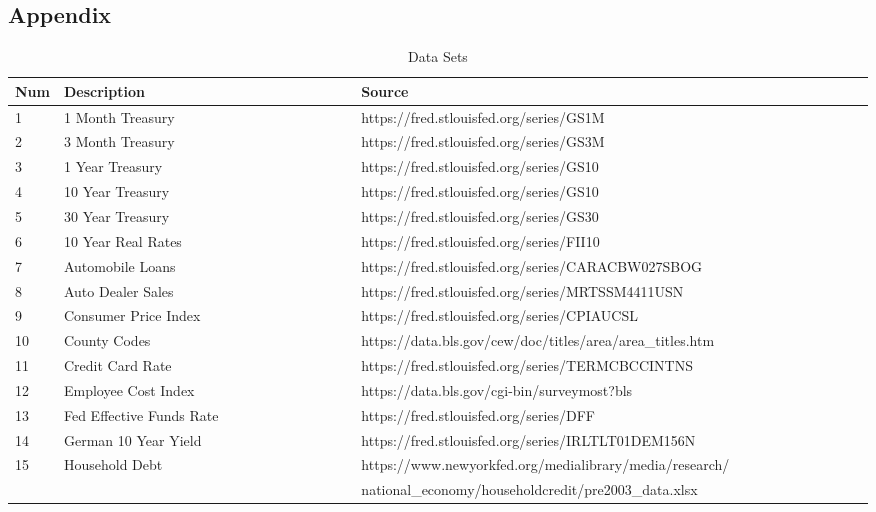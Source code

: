 \documentclass[sigconf,nonacm,11pt]{acmart}
\begin{document}



\appendix
\begin{appendix}

\section{Appendix}
\label{appendix:datasets}




\begin{table}[ht]
\caption{Data Sets}
\centering
\begin{tabular}{p{0.05\linewidth}p{0.35\linewidth}p{0.6\linewidth}}
\hline
Num & Description & Source\\
\hline
1 & 1 Month Treasury & https://fred.stlouisfed.org/series/GS1M\\
2 & 3 Month Treasury & https://fred.stlouisfed.org/series/GS3M\\
3 & 1 Year Treasury & https://fred.stlouisfed.org/series/GS10\\
4 & 10 Year Treasury & https://fred.stlouisfed.org/series/GS10\\
5 & 30 Year Treasury & https://fred.stlouisfed.org/series/GS30\\
6 & 10 Year Real Rates & https://fred.stlouisfed.org/series/FII10\\
7 & Automobile Loans & https://fred.stlouisfed.org/series/CARACBW027SBOG\\
8 & Auto Dealer Sales & https://fred.stlouisfed.org/series/MRTSSM4411USN\\
9 & Consumer Price Index & https://fred.stlouisfed.org/series/CPIAUCSL\\
10 & County Codes & https://data.bls.gov/cew/doc/titles/area/area\_titles.htm\\
11 & Credit Card Rate & https://fred.stlouisfed.org/series/TERMCBCCINTNS\\
12 & Employee Cost Index & https://data.bls.gov/cgi-bin/surveymost?bls\\
13 & Fed Effective Funds Rate  & https://fred.stlouisfed.org/series/DFF\\
14 & German 10 Year Yield & https://fred.stlouisfed.org/series/IRLTLT01DEM156N\\
15 & Household Debt & https://www.newyorkfed.org/medialibrary/media/research/\\
 & & national\_economy/householdcredit/pre2003\_data.xlsx\\ 

\end{tabular}
\end{table}
\end{appendix}
\end{document}
